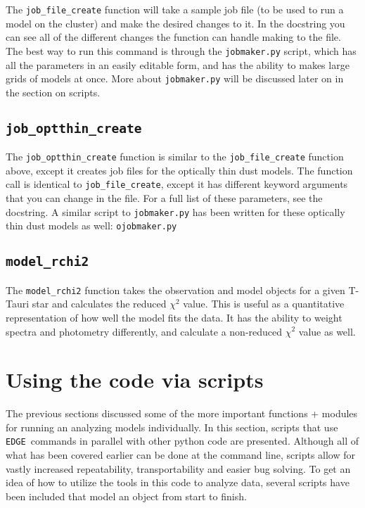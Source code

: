 \documentclass{emulateapj}
\newcommand{\edge}{\texttt{EDGE }}
\begin{document}
The \texttt{job\_file\_create} function will take a sample job file (to be used to run a model on the cluster) and make the desired changes to it. In the docstring you can see all of the different changes the function can handle making to the file. The best way to run this command is through the \texttt{jobmaker.py} script, which has all the parameters in an easily editable form, and has the ability to makes large grids of models at once. More about \texttt{jobmaker.py} will be discussed later on in the section on scripts.


\subsection{\texttt{job\_optthin\_create}}
The \texttt{job\_optthin\_create} function is similar to the \texttt{job\_file\_create} function above, except it creates job files for the optically thin dust models. The function call is identical to \texttt{job\_file\_create}, except it has different keyword arguments that you can change in the file. For a full list of these parameters, see the docstring. A similar script to \texttt{jobmaker.py} has been written for these optically thin dust models as well: \texttt{ojobmaker.py}


\subsection{\texttt{model\_rchi2}}
 
The \texttt{model\_rchi2} function takes the observation and model objects for a given T-Tauri star and calculates the reduced $\chi^2$ value. This is useful as a quantitative representation of how well the model fits the data. It has the ability to weight spectra and photometry differently, and calculate a non-reduced $\chi^2$ value as well. 

\section{Using the code via scripts}

The previous sections discussed some of the more important functions + modules for running an analyzing models individually. In this section, scripts that use \edge commands in parallel with other python code are presented. Although all of what has been covered earlier can be done at the command line, scripts allow for vastly increased repeatability, transportability and easier bug solving. To get an idea of how to utilize the tools in this code to analyze data, several scripts have been included that model an object from start to finish.
\end{document}
